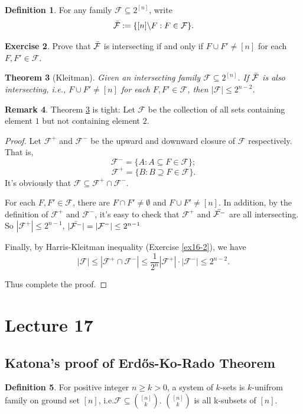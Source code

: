 \documentclass{article}
\newtheorem{theorem}{Theorem}[section]
\theoremstyle{definition}
\newtheorem{remark}[theorem]{Remark}
\newtheorem{definition}[theorem]{Definition}
\newtheorem{exercise}[theorem]{Exercise}
\def\Erdos{Erd\H{o}s}
\begin{document}
\begin{definition}
    For any family $\mathcal{F} \subseteq 2^{[n]}$, write $$\Bar{\mathcal{F}} := \{ [n]\backslash F: F \in \mathcal{F} \}.$$
\end{definition}
\begin{exercise}
    Prove that $\Bar{\mathcal{F}}$ is intersecting if and only if $F \cup F' \neq [n]$ for each $F, F' \in \mathcal{F}$.
\end{exercise}
\begin{theorem}[Kleitman]\label{K2}
    Given an intersecting family $\mathcal{F} \subseteq 2^{[n]}$. If $\Bar{\mathcal{F}}$ is also intersecting, i.e., $F \cup F' \neq [n]$ for each $F, F' \in \mathcal{F}$, then $|\mathcal{F}| \leq 2^{n-2}$.
\end{theorem}
\begin{remark}
    Theorem \ref{K2} is tight: Let $\mathcal{F}$ be the collection of all sets containing element $1$ but not containing element $2$.
\end{remark}
\begin{proof}
    Let $\mathcal{F}^+$ and $\mathcal{F}^-$ be the upward and downward closure of $\mathcal{F}$ respectively. That is, $$\mathcal{F}^- = \{A: A\subseteq F\in \mathcal{F}\};$$ $$\mathcal{F}^+ = \{B: B\supseteq F\in \mathcal{F}\}.$$
    It's obviously that $\mathcal{F}\subseteq \mathcal{F}^+\cap \mathcal{F}^-$.

    For each $F,F' \in \mathcal{F}$, there are $F \cap F' \neq \emptyset$ and $F \cup F' \neq [n]$. In addition, by the definition of $\mathcal{F}^+$ and $\mathcal{F}^-$, it's easy to check that $\mathcal{F}^+$ and $\Bar{\mathcal{F}^-}$ are all intersecting. So $|\mathcal{F}^+| \leq 2^{n-1}$, $|\Bar{\mathcal{F}^-}| = |\mathcal{F}^-| \leq 2^{n-1}$
    
    Finally, by Harris-Kleitman inequality (Exercise \ref{ex16-2}), we have $$|\mathcal{F}| \leq |\mathcal{F}^+\cap \mathcal{F}^-| \leq \frac{1}{2^n}|\mathcal{F}^+|\cdot|\mathcal{F}^-| \leq 2^{n-2}.$$

    Thus complete the proof.
\end{proof}

\newpage
\section{Lecture 17}
\subsection{Katona's proof of \Erdos{}-Ko-Rado Theorem}
\begin{definition}
For positive integer $n \ge k > 0$, a system of $k$-sets is $k$-unifrom family on ground set $[n]$, i.e.$\mathcal{F}\subseteq \binom{[n]}{k}$. $\binom{[n]}{k}$ is all k-subsets of $[n]$.
\end{definition}
\end{document}
